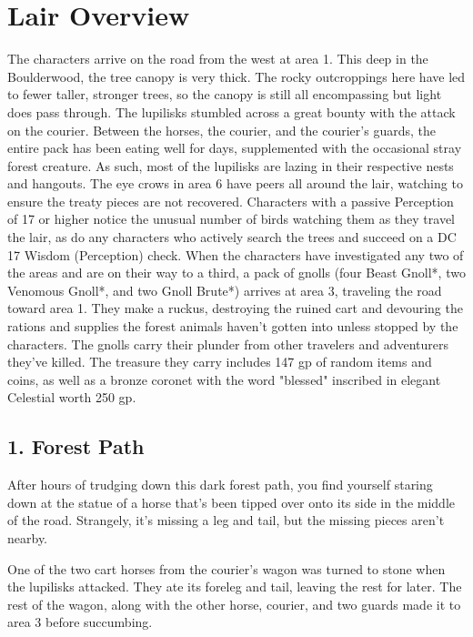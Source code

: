 \documentclass[10pt,a4paper,twoside,twocolumn,openany,bg=print,nodeprecatedcode]{dndbook}
\begin{document}
\section{Lair Overview}
The characters arrive on the road from the west at area 1. This deep in the Boulderwood, the tree canopy is very thick. The rocky outcroppings here have led to fewer taller, stronger trees, so the canopy is still all encompassing but light does pass through.
The lupilisks stumbled across a great bounty with the attack on the courier. Between the horses, the courier, and the courier's guards, the entire pack has been eating well for days, supplemented with the occasional stray forest creature. As such, most of the lupilisks are lazing in their respective nests and hangouts.
The eye crows in area 6 have peers all around the lair, watching to ensure the treaty pieces are not recovered. Characters with a passive Perception of 17 or higher notice the unusual number of birds watching them as they travel the lair, as do any characters who actively search the trees and succeed on a DC 17 Wisdom (Perception) check.
When the characters have investigated any two of the areas and are on their way to a third, a pack of gnolls (four Beast Gnoll*, two Venomous Gnoll*, and two Gnoll Brute*) arrives at area 3, traveling the road toward area 1. They make a ruckus, destroying the ruined cart and devouring the rations and supplies the forest animals haven't gotten into unless stopped by the characters. The gnolls carry their plunder from other travelers and adventurers they've killed. The treasure they carry includes 147 gp of random items and coins, as well as a bronze coronet with the word "blessed" inscribed in elegant Celestial worth 250 gp.
\subsection{1. Forest Path}
\begin{DndReadAloud}{}
After hours of trudging down this dark forest path, you find yourself staring down at the statue of a horse that's been tipped over onto its side in the middle of the road. Strangely, it's missing a leg and tail, but the missing pieces aren't nearby.
\end{DndReadAloud}

One of the two cart horses from the courier's wagon was turned to stone when the lupilisks attacked. They ate its foreleg and tail, leaving the rest for later. The rest of the wagon, along with the other horse, courier, and two guards made it to area 3 before succumbing.
\end{document}
